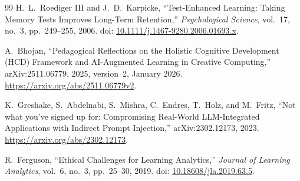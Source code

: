 \documentclass[11pt,a4paper]{article}
\begin{document}
\begin{thebibliography}{99}
H.~L.~Roediger III and J.~D.~Karpicke,
``Test-Enhanced Learning: Taking Memory Tests Improves Long-Term Retention,''
\emph{Psychological Science}, vol.~17, no.~3, pp.~249--255, 2006.
doi: \href{https://doi.org/10.1111/j.1467-9280.2006.01693.x}{10.1111/j.1467-9280.2006.01693.x}.

A.~Bhojan, ``Pedagogical Reflections on the Holistic Cognitive Development (HCD) Framework and AI-Augmented Learning in Creative Computing,''
arXiv:2511.06779, 2025, version~2, January 2026.
\url{https://arxiv.org/abs/2511.06779v2}.

K.~Greshake, S.~Abdelnabi, S.~Mishra, C.~Endres, T.~Holz, and M.~Fritz,
``Not what you've signed up for: Compromising Real-World LLM-Integrated Applications with Indirect Prompt Injection,''
arXiv:2302.12173, 2023.
\url{https://arxiv.org/abs/2302.12173}.

R.~Ferguson, ``Ethical Challenges for Learning Analytics,''
\emph{Journal of Learning Analytics}, vol.~6, no.~3, pp.~25--30, 2019.
doi: \href{https://doi.org/10.18608/jla.2019.63.5}{10.18608/jla.2019.63.5}.
\end{thebibliography}

\end{document}
